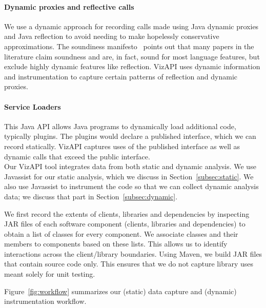 \paragraph{Dynamic proxies and reflective calls} We use a dynamic approach for recording calls made using Java dynamic proxies and Java reflection to avoid needing to make hopelessly conservative approximations. The soundiness manifesto~\cite{livshits15:_in_defen_sound} points out that many papers in the literature claim soundness and are, in fact, sound for most language features, but exclude highly dynamic features like reflection. VizAPI uses dynamic information and instrumentation to capture certain patterns of reflection and dynamic proxies.

\paragraph{Service Loaders} This Java API allows Java programs to dynamically load additional code, typically plugins. The plugins would declare a published interface, which we can record statically. VizAPI captures uses of the published interface as well as dynamic calls that exceed the public interface.\\


Our VizAPI tool integrates data from both static and dynamic analysis.
We use Javassist for our static analysis, which we discuss in Section~\ref{subsec:static}. We also use Javassist to instrument the code so that we can
collect dynamic analysis data; we discuss that part in
Section~\ref{subsec:dynamic}.

We first record the extents of clients, libraries and dependencies by inspecting JAR
files of each software component (clients, libraries and dependencies) to obtain a
list of classes for every component. We associate classes and their
members to components based on these lists.  This allows us to
identify interactions across the client/library boundaries. Using Maven, we build JAR
files that contain source code only. This ensures that we do not
capture library uses meant solely for unit testing. 

Figure~\ref{fig:workflow} summarizes our
(static) data capture and (dynamic) instrumentation workflow.  \\

